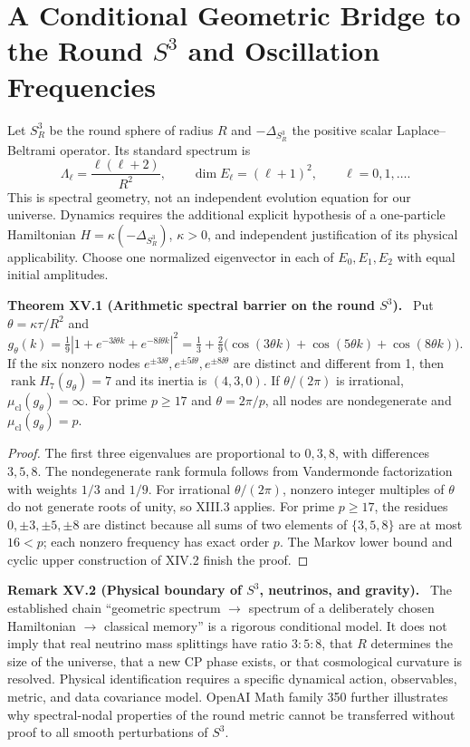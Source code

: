 \documentclass[11pt,a4paper,oneside]{book}
\DeclareMathOperator{\rank}{rank}\DeclareMathOperator{\Tr}{Tr}
\newcommand{\statement}[3]{\par\medskip\noindent\textbf{#1 #2 (#3).}\ }
\begin{document}
\chapter{A Conditional Geometric Bridge to the Round $S^3$ and Oscillation Frequencies}
Let $S_R^3$ be the round sphere of radius $R$ and $-\Delta_{S_R^3}$ the positive scalar Laplace--Beltrami operator. Its standard spectrum is
\[\Lambda_\ell=\frac{\ell(\ell+2)}{R^2},\qquad\dim E_\ell=(\ell+1)^2,\qquad\ell=0,1,\ldots.\]
This is spectral geometry, not an independent evolution equation for our universe. Dynamics requires the additional explicit hypothesis of a one-particle Hamiltonian $H=\kappa(-\Delta_{S_R^3})$, $\kappa>0$, and independent justification of its physical applicability. Choose one normalized eigenvector in each of $E_0,E_1,E_2$ with equal initial amplitudes.
\statement{Theorem}{XV.1}{Arithmetic spectral barrier on the round $S^3$} Put $\theta=\kappa\tau/R^2$ and
\[g_\theta(k)=\tfrac19|1+e^{-3\ii\theta k}+e^{-8\ii\theta k}|^2=\tfrac13+\tfrac29\bigl(\cos(3\theta k)+\cos(5\theta k)+\cos(8\theta k)\bigr).\]
If the six nonzero nodes $e^{\pm3\ii\theta},e^{\pm5\ii\theta},e^{\pm8\ii\theta}$ are distinct and different from 1, then $\rank H_7(g_\theta)=7$ and its inertia is $(4,3,0)$. If $\theta/(2\pi)$ is irrational, $\mu_{\mathrm{cl}}(g_\theta)=\infty$. For prime $p\ge17$ and $\theta=2\pi/p$, all nodes are nondegenerate and $\mu_{\mathrm{cl}}(g_\theta)=p$.
\begin{proof}The first three eigenvalues are proportional to $0,3,8$, with differences $3,5,8$. The nondegenerate rank formula follows from Vandermonde factorization with weights $1/3$ and $1/9$. For irrational $\theta/(2\pi)$, nonzero integer multiples of $\theta$ do not generate roots of unity, so XIII.3 applies. For prime $p\ge17$, the residues $0,\pm3,\pm5,\pm8$ are distinct because all sums of two elements of $\{3,5,8\}$ are at most $16<p$; each nonzero frequency has exact order $p$. The Markov lower bound and cyclic upper construction of XIV.2 finish the proof.\end{proof}
\statement{Remark}{XV.2}{Physical boundary of $S^3$, neutrinos, and gravity} The established chain ``geometric spectrum $\to$ spectrum of a deliberately chosen Hamiltonian $\to$ classical memory'' is a rigorous conditional model. It does not imply that real neutrino mass splittings have ratio $3:5:8$, that $R$ determines the size of the universe, that a new CP phase exists, or that cosmological curvature is resolved. Physical identification requires a specific dynamical action, observables, metric, and data covariance model. OpenAI Math family 350 further illustrates why spectral-nodal properties of the round metric cannot be transferred without proof to all smooth perturbations of $S^3$.
\end{document}
